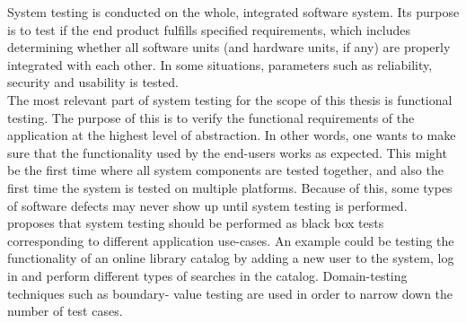 System testing is conducted on the whole, integrated software system.
Its purpose is to test if the end product fulfills specified
requirements, which includes determining whether all software units (and
hardware units, if any) are properly integrated with each other. In some
situations, parameters such as reliability, security and usability is
tested. \cite{book:adp}\\

The most relevant part of system testing for the scope of this thesis is
functional testing. The purpose of this is to verify the functional
requirements of the application at the highest level of abstraction. In
other words, one wants to make sure that the functionality used by the
end-users works as expected. This might be the first time where all
system components are tested together, and also the first time the
system is tested on multiple platforms. Because of this, some types of
software defects may never show up until system testing is
performed. \cite{book:adp}\\

\citeauthor{book:adp} proposes that system testing should be performed
as black box tests corresponding to different application use-cases. An
example could be testing the functionality of an online library catalog
by adding a new user to the system, log in and perform different types
of searches in the catalog. Domain-testing techniques such as boundary-
value testing are used in order to narrow down the number of test
cases.\\
